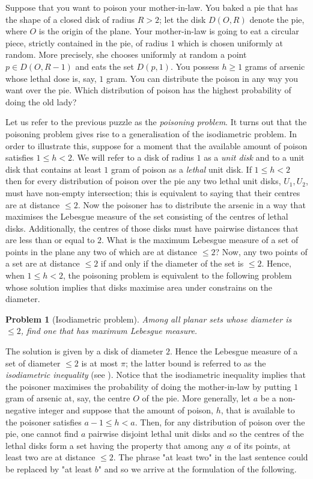 \documentclass[12pt]{article}
\newtheorem{prbl}[thm]{Problem}
\begin{document}
Suppose that you want to poison your mother-in-law.
You baked a pie that has the shape of a closed disk of radius $R>2$; let the disk
$D(O,R)$ denote the pie, where $O$ is the origin of the plane. 
Your mother-in-law is going to eat a circular piece,
strictly contained in the pie, of radius $1$ which is chosen uniformly at random. 
More precisely, she chooses uniformly at random a point $p\in D(O,R-1)$ 
and eats the set $D(p,1)$.
You possess $h\geq 1$ grams of arsenic whose lethal dose is, say, $1$ gram. 
You can distribute the poison in any way you want over the pie. Which distribution of poison has the 
highest probability of doing the old lady?

Let us refer to the previous puzzle as the \emph{poisoning problem}.
It turns out that the poisoning problem gives rise to a generalisation of the isodiametric problem. 
In order to illustrate this,
suppose for a moment that the available amount of poison satisfies $1\leq h < 2$. 
We will refer to a disk of radius $1$ as a \emph{unit disk}  and
to a unit disk that contains at least $1$ gram of poison as a  \emph{lethal} unit disk. 
If $1\leq h < 2$ then for every
distribution of poison over the pie any two lethal unit disks, $U_1,U_2$, must
have non-empty intersection; this is equivalent to saying that 
their centres are at distance $\leq 2$. Now the poisoner has to distribute the arsenic 
in a way that maximises the Lebesgue measure of the set consisting of the centres of lethal disks. 
Additionally, the centres of those disks must have pairwise distances that are less than or equal to $2$.
What is the maximum Lebesgue measure of a set of points in the plane
any two of which are at distance $\leq 2$?
Now, any two points of a set are at distance $\leq 2$ if and only if
the diameter of the set is $\leq 2$. Hence, when $1\leq h<2$, the poisoning problem is
equivalent to the following problem whose solution implies that disks maximise
area under constrains on the diameter. 

\begin{prbl}[Isodiametric problem] Among all planar sets whose diameter is $\leq 2$, find one that
has maximum Lebesgue measure. 
\end{prbl}

The solution is given by a disk of diameter $2$. Hence the Lebesgue measure of a set of diameter 
$\leq 2$ is at most $\pi$; the latter bound is referred to as the \emph{isodiametric inequality} (see \cite{Gruber}). 
Notice that the isodiametric inequality implies that the 
poisoner maximises the probability of doing the mother-in-law  by
putting $1$ gram of arsenic at, say, the centre $O$ of the pie.
More generally, let $a$ be a non-negative integer and suppose that the amount of 
poison, $h$, that is available to the poisoner satisfies 
$a-1\leq h<a$. Then, for any distribution of poison over the pie,
one cannot find $a$ pairwise disjoint lethal unit disks
and so  the centres of the lethal disks form a set having  the property that among any $a$ of its points, 
at least two are at distance $\leq 2$.  The phrase "at least two" in the last sentence could be replaced by 
"at least $b$" and so
we arrive at the formulation of the following. 
\end{document}
